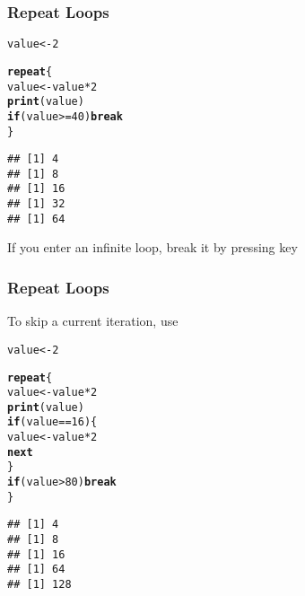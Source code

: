 \documentclass[12pt]{beamer}\usepackage[]{graphicx}\usepackage[]{color}
\makeatletter
\newcommand{\hlnum}[1]{\textcolor[rgb]{0.686,0.059,0.569}{#1}}%
\newcommand{\hlopt}[1]{\textcolor[rgb]{0,0,0}{#1}}%
\newcommand{\hlstd}[1]{\textcolor[rgb]{0.345,0.345,0.345}{#1}}%
\newcommand{\hlkwa}[1]{\textcolor[rgb]{0.161,0.373,0.58}{\textbf{#1}}}%
\newcommand{\hlkwb}[1]{\textcolor[rgb]{0.69,0.353,0.396}{#1}}%
\newcommand{\hlkwd}[1]{\textcolor[rgb]{0.737,0.353,0.396}{\textbf{#1}}}%
\newenvironment{kframe}{%
 \def\at@end@of@kframe{}%
 \ifinner\ifhmode%
  \def\at@end@of@kframe{\end{minipage}}%
  \begin{minipage}{\columnwidth}%
 \fi\fi%
 \def\FrameCommand##1{\hskip\@totalleftmargin \hskip-\fboxsep
 \colorbox{shadecolor}{##1}\hskip-\fboxsep
     \hskip-\linewidth \hskip-\@totalleftmargin \hskip\columnwidth}%
 \MakeFramed {\advance\hsize-\width
   \@totalleftmargin\z@ \linewidth\hsize
   \@setminipage}}%
 {\par\unskip\endMakeFramed%
 \at@end@of@kframe}
\newenvironment{knitrout}{}{} %
\makeatother
\begin{document}

\begin{frame}[fragile]
\frametitle{Repeat Loops}

\begin{knitrout}\footnotesize
{}\color{fgcolor}\begin{kframe}
\begin{alltt}
\hlstd{value} \hlkwb{<-} \hlnum{2}

\hlkwa{repeat} \hlstd{\{}
  \hlstd{value} \hlkwb{<-} \hlstd{value} \hlopt{*} \hlnum{2}
  \hlkwd{print}\hlstd{(value)}
  \hlkwa{if} \hlstd{(value} \hlopt{>=} \hlnum{40}\hlstd{)} \hlkwa{break}
\hlstd{\}}
\end{alltt}
\begin{verbatim}
## [1] 4
## [1] 8
## [1] 16
## [1] 32
## [1] 64
\end{verbatim}
\end{kframe}
\end{knitrout}

If you enter an infinite loop, break it by pressing  key

\end{frame}


\begin{frame}[fragile]
\frametitle{Repeat Loops}

To skip a current iteration, use 
\begin{knitrout}\footnotesize
{}\color{fgcolor}\begin{kframe}
\begin{alltt}
\hlstd{value} \hlkwb{<-} \hlnum{2}

\hlkwa{repeat} \hlstd{\{}
  \hlstd{value} \hlkwb{<-} \hlstd{value} \hlopt{*} \hlnum{2}
  \hlkwd{print}\hlstd{(value)}
  \hlkwa{if} \hlstd{(value} \hlopt{==} \hlnum{16}\hlstd{) \{}
    \hlstd{value} \hlkwb{<-} \hlstd{value} \hlopt{*} \hlnum{2}
    \hlkwa{next}
  \hlstd{\}}
  \hlkwa{if} \hlstd{(value} \hlopt{>} \hlnum{80}\hlstd{)} \hlkwa{break}
\hlstd{\}}
\end{alltt}
\begin{verbatim}
## [1] 4
## [1] 8
## [1] 16
## [1] 64
## [1] 128
\end{verbatim}
\end{kframe}
\end{knitrout}

\end{frame}
\end{document}
